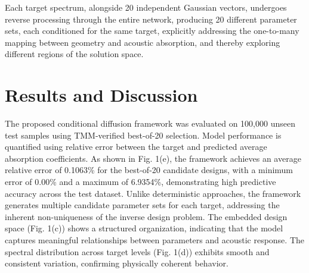 \documentclass[conference]{IEEEtran}
\begin{document}
Each target spectrum, alongside 20 independent Gaussian vectors, undergoes reverse processing through the entire network, producing 20 different parameter sets, each conditioned for the same target, explicitly addressing the one-to-many mapping between geometry and acoustic absorption, and thereby exploring different regions of the solution space.

\vspace{-1ex}



\section{Results and Discussion}

The proposed conditional diffusion framework was evaluated on 100,000 unseen test samples using TMM-verified best-of-20 selection. Model performance is quantified using relative error between the target and predicted average absorption coefficients. As shown in Fig. 1(e), the framework achieves an average relative error of 0.1063\% for the best-of-20 candidate designs, with a minimum error of 0.00\% and a maximum of 6.9354\%, demonstrating high predictive accuracy across the test dataset. Unlike deterministic approaches, the framework generates multiple candidate parameter sets for each target, addressing the inherent non-uniqueness of the inverse design problem. The embedded design space (Fig. 1(c)) shows a structured organization, indicating that the model captures meaningful relationships between parameters and acoustic response. The spectral distribution across target levels (Fig. 1(d)) exhibits smooth and consistent variation, confirming physically coherent behavior.  
\end{document}
